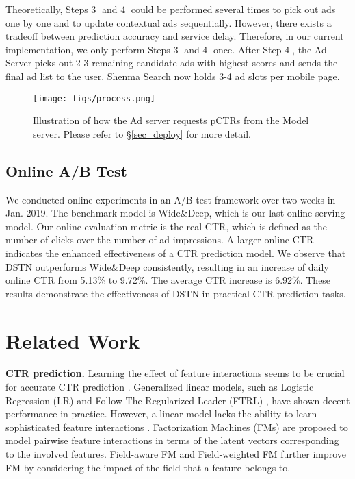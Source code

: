\documentclass[sigconf]{acmart}
\begin{document}
Theoretically, Steps \textcircled{3} and \textcircled{4} could be performed several times to pick out ads one by one and to update contextual ads sequentially. However, there exists a tradeoff between prediction accuracy and service delay. Therefore, in our current implementation, we only perform Steps \textcircled{3} and \textcircled{4} once. After Step \textcircled{4}, the Ad Server picks out 2-3 remaining candidate ads with highest scores and sends the final ad list to the user. Shenma Search now holds 3-4 ad slots per mobile page.

\begin{figure}[!t]
\centering
\texttt{[image: figs/process.png]}
\vskip -8pt
\caption{Illustration of how the Ad server requests pCTRs from the Model server. Please refer to \S\ref{sec_deploy} for more detail.}
\vskip -11pt
\label{process}
\end{figure}

\subsection{Online A/B Test}
We conducted online experiments in an A/B test framework over two weeks in Jan. 2019. The benchmark model is Wide\&Deep, which is our last online serving model. Our online evaluation metric is the real CTR, which is defined as the number of clicks over the number of ad impressions. A larger online CTR indicates the enhanced effectiveness of a CTR prediction model.
We observe that DSTN outperforms Wide\&Deep consistently, resulting in an increase of daily online CTR from 5.13\% to 9.72\%. The average CTR increase is 6.92\%. These results demonstrate the effectiveness of DSTN in practical CTR prediction tasks.

\section{Related Work}
\textbf{CTR prediction.}
Learning the effect of feature interactions seems to be crucial for accurate CTR prediction \cite{rendle2010factorization}.
Generalized linear models, such as Logistic Regression (LR) \cite{richardson2007predicting} and Follow-The-Regularized-Leader (FTRL) \cite{mcmahan2013ad}, have shown decent performance in practice. However, a linear model lacks the ability to learn sophisticated feature interactions \cite{chapelle2015simple}. Factorization Machines (FMs) \cite{rendle2010factorization, blondel2016higher} are proposed to model pairwise feature interactions in terms of the latent vectors corresponding to the involved features. Field-aware FM \cite{juan2016field} and Field-weighted FM \cite{pan2018field} further improve FM by considering the impact of the field that a feature belongs to.
\end{document}
